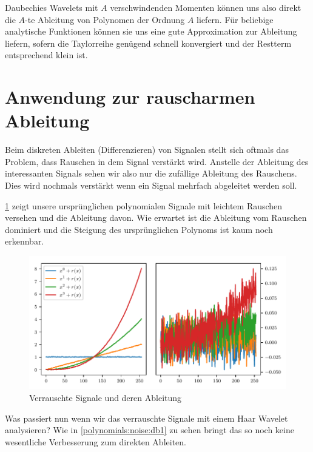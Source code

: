 \begin{refsection}
Daubechies Wavelets mit $A$ verschwindenden Momenten können uns also direkt die
$A$-te Ableitung von Polynomen der Ordnung $A$ liefern. Für beliebige
analytische Funktionen können sie uns eine gute Approximation zur Ableitung
liefern, sofern die Taylorreihe genügend schnell konvergiert und der Restterm
entsprechend klein ist.

\section{Anwendung zur rauscharmen Ableitung}

Beim diskreten Ableiten (Differenzieren) von Signalen stellt sich oftmals das
Problem, dass Rauschen in dem Signal verstärkt wird. Anstelle der Ableitung des
interessanten Signals sehen wir also nur die zufällige Ableitung des Rauschens.
Dies wird nochmals verstärkt wenn ein Signal mehrfach abgeleitet werden soll.

\cref{polynomials:noise:signals} zeigt unsere ursprünglichen polynomialen
Signale mit leichtem Rauschen versehen und die Ableitung davon. Wie erwartet
ist die Ableitung vom Rauschen dominiert und die Steigung des ursprünglichen
Polynoms ist kaum noch erkennbar.

\begin{figure}
    \centering
    \includegraphics{papers/polynomials/images/polynomials_noise_signals.pdf}
    \caption{Verrauschte Signale und deren Ableitung\label{polynomials:noise:signals}}
\end{figure}

Was passiert nun wenn wir das verrauschte Signale mit einem Haar Wavelet
analysieren?  Wie in \cref{polynomials:noise:db1} zu sehen bringt das so noch
keine wesentliche Verbesserung zum direkten Ableiten.


\end{refsection}
